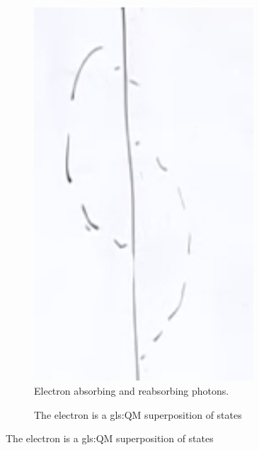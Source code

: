 \documentclass[]{article}
\begin{document}
\begin{figure}[H]
	\caption{Emission and absorption of photons}
	\begin{subfigure}[t]{0.45\textwidth}
		\caption{Electron absorbing and reabsorbing photons.}
		\includegraphics[width=0.9\textwidth]{2-1-electron-photons0}
	\end{subfigure}
	\begin{subfigure}[t]{0.45\textwidth}
		\caption{The electron is a \gls{gls:QM} superposition of states}\label{fig:2-1-electron-photons}

\end{subfigure}
\end{figure}
\end{document}
